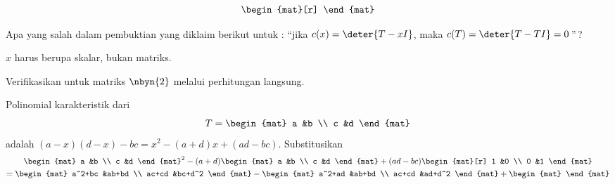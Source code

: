 \begin{exercises}
\begin{answer}
\begin{equation*}
\begin{mat}[r]
            \end{mat}
        \end{equation*} 
      \end{answer}
  \item 
     Apa yang salah dalam pembuktian yang diklaim berikut untuk
     :
      ``jika \( c(x)=\deter{T-xI} \), maka \( c(T)=\deter{T-TI}=0 \,\)''\,?
     \cite{Cullen}
     \begin{answer}
       \( x \) harus berupa skalar, bukan matriks.
     \end{answer}
  \item 
    Verifikasikan  untuk matriks
    \( \nbyn{2} \) melalui perhitungan langsung.
    \begin{answer}
      Polinomial karakteristik dari
      \begin{equation*}
         T=\begin{mat}
              a  &b  \\
              c  &d
           \end{mat}
      \end{equation*}
      adalah \( (a-x)(d-x)-bc=x^2-(a+d)x+(ad-bc) \).
      Substitusikan
      \begin{multline*}
         \begin{mat}
              a  &b  \\
              c  &d
         \end{mat}^2
         -
         (a+d)\begin{mat}
            a  &b  \\
            c  &d
         \end{mat}
         +
         (ad-bc)\begin{mat}[r]
            1  &0  \\
            0  &1
         \end{mat}                            \\
         =                     
         \begin{mat}
            a^2+bc  &ab+bd  \\
            ac+cd   &bc+d^2
         \end{mat}
         -
         \begin{mat}
            a^2+ad  &ab+bd   \\
            ac+cd   &ad+d^2
         \end{mat}
         +
         \begin{mat}

\end{mat}
\end{multline*}
\end{answer}
\end{exercises}
